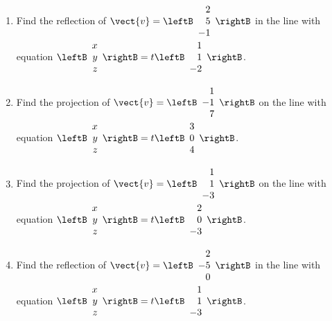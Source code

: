 \begin{multicols}{2}
\begin{ex}
\begin{enumerate}[label={\alph*.}]
\item Find the reflection of 
$\vect{v} = \leftB
\begin{array}{r}
2\\
5\\
-1 
\end{array}
\rightB$
in the line with equation 
$\leftB
\begin{array}{r}
x\\
y\\
z 
\end{array}
\rightB
= t
\leftB
\begin{array}{r}
1\\
1\\
-2 
\end{array}
\rightB$.

\item Find the projection of 
$\vect{v} = \leftB
\begin{array}{r}
1\\
-1\\
7 
\end{array}
\rightB$
 on the line with equation $\leftB
 \begin{array}{r}
 x\\
 y\\
 z 
 \end{array}
 \rightB
 = t
 \leftB
 \begin{array}{r}
 3\\
 0\\
 4 
 \end{array}
 \rightB$.

\item Find the projection of 
$\vect{v} = \leftB
\begin{array}{r}
1\\
1\\
-3
\end{array}
\rightB$
 on the line with equation 
 $\leftB
 \begin{array}{r}
 x\\
 y\\
 z 
 \end{array}
 \rightB
 = t
 \leftB
 \begin{array}{r}
 2\\
 0\\
 -3 
 \end{array}
 \rightB$.

\item Find the reflection of 
$\vect{v} = \leftB
\begin{array}{r}
2\\
-5\\
0 
\end{array}
\rightB$
 in the line with equation 
 $\leftB
 \begin{array}{r}
 x\\
 y\\
 z 
 \end{array}
 \rightB
 = t
 \leftB
 \begin{array}{r}
 1\\
 1\\
 -3
 \end{array}
 \rightB$.


\end{enumerate}
\end{ex}
\end{multicols}
